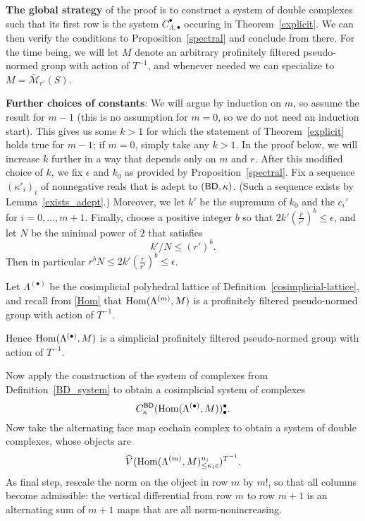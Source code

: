 \textbf{The global strategy}
of the proof is to construct a system of double complexes
such that its first row is the system $C_{\Lambda, \bullet}^\bullet$
occuring in Theorem~\ref{explicit}.
We can then verify the conditions to Proposition~\ref{spectral}
and conclude from there.
For the time being, we will let $M$ denote
an arbitrary profinitely filtered pseudo-normed group with action of $T^{-1}$,
and whenever needed we can specialize to $M = \overline{\mathcal M}_{r'}(S)$.

\textbf{Further choices of constants}:
We will argue by induction on $m$, so assume the result for $m-1$
(this is no assumption for $m=0$, so we do not need an induction start).
This gives us some $k>1$ for which the statement of Theorem~\ref{explicit} holds true for $m-1$;
if $m=0$, simply take any $k>1$.
In the proof below, we will increase $k$ further in a way that depends only on $m$ and $r$.
After this modified choice of $k$, we fix $\epsilon$ and $k_0$ as provided by Proposition~\ref{spectral}.
Fix a sequence $(\kappa'_i)_i$ of nonnegative reals that is adept to $(\mathsf{BD}, \kappa)$.
(Such a sequence exists by Lemma~\ref{exists_adept}.)
Moreover, we let $k'$ be the supremum of $k_0$ and the $c_i'$ for $i=0,\ldots,m+1$.
Finally, choose a positive integer $b$ so that $2k'(\tfrac r{r'})^b\leq \epsilon$,
and let $N$ be the minimal power of $2$ that satisfies
\[
  k'/N\leq (r')^b.
\]
Then in particular $r^bN\leq 2k'(\tfrac{r}{r'})^b\leq \epsilon$.

\begin{definition}
  \label{double_complex}
  \leanok
  Let $\Lambda^{(\bullet)}$ be the cosimplicial polyhedral lattice of
  Definition~\ref{cosimplicial-lattice},
  and recall from \ref{Hom} that $\operatorname{Hom}(\Lambda^{(m)}, M)$ is a
  profinitely filtered pseudo-normed group with action of $T^{-1}$.

  Hence $\operatorname{Hom}(\Lambda^{(\bullet)}, M)$ is a simplicial
  profinitely filtered pseudo-normed group with action of $T^{-1}$.
  
  Now apply the construction of the system of complexes from
  Definition~\ref{BD_system} to obtain a cosimplicial system of complexes
  \[
    C^{\mathsf{BD}}_{\kappa}(\operatorname{Hom}(\Lambda^{(\bullet)}, M))_\bullet^\bullet.
  \]
  Now take the alternating face map cochain complex
  to obtain a system of double complexes, whose objects are
  \[
    \widehat{V}(\operatorname{Hom}(\Lambda^{(m)},M)_{\leq \kappa_ic}^{n_i})^{T^{-1}}.
  \]
  As final step, rescale the norm on the object in row $m$ by $m!$,
  so that all columns become admissible:
  the vertical differential from row $m$ to row $m+1$
  is an alternating sum of $m+1$ maps that are all norm-nonincreasing.
\end{definition}

